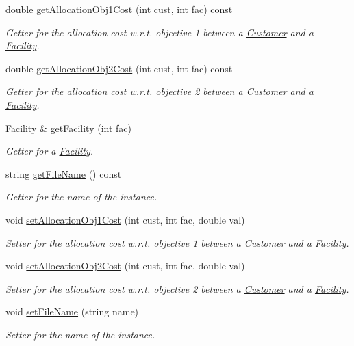 \begin{DoxyCompactItemize}
double \hyperlink{classData_add619285c8d74b143cb2526d319a2d55}{get\-Allocation\-Obj1\-Cost} (int cust, int fac) const 
\begin{DoxyCompactList}\small\item\em \-Getter for the allocation cost w.\-r.\-t. objective 1 between a {\ttfamily \hyperlink{classCustomer}{\-Customer}} and a {\ttfamily \hyperlink{classFacility}{\-Facility}}. \end{DoxyCompactList}\item 
double \hyperlink{classData_a3767a72ca109a228b506fbe3e14f90d9}{get\-Allocation\-Obj2\-Cost} (int cust, int fac) const 
\begin{DoxyCompactList}\small\item\em \-Getter for the allocation cost w.\-r.\-t. objective 2 between a {\ttfamily \hyperlink{classCustomer}{\-Customer}} and a {\ttfamily \hyperlink{classFacility}{\-Facility}}. \end{DoxyCompactList}\item 
\hyperlink{classFacility}{\-Facility} \& \hyperlink{classData_abde0e78402b92f0abe7937f027c391fe}{get\-Facility} (int fac)
\begin{DoxyCompactList}\small\item\em \-Getter for a {\ttfamily \hyperlink{classFacility}{\-Facility}}. \end{DoxyCompactList}\item 
string \hyperlink{classData_abd146628c404ac6483308e081a458b28}{get\-File\-Name} () const 
\begin{DoxyCompactList}\small\item\em \-Getter for the name of the instance. \end{DoxyCompactList}\item 
void \hyperlink{classData_a604a5141bbc46e2d246a6adbc815216e}{set\-Allocation\-Obj1\-Cost} (int cust, int fac, double val)
\begin{DoxyCompactList}\small\item\em \-Setter for the allocation cost w.\-r.\-t. objective 1 between a {\ttfamily \hyperlink{classCustomer}{\-Customer}} and a {\ttfamily \hyperlink{classFacility}{\-Facility}}. \end{DoxyCompactList}\item 
void \hyperlink{classData_a9c86a4f1223b800bc226678e16b3dd18}{set\-Allocation\-Obj2\-Cost} (int cust, int fac, double val)
\begin{DoxyCompactList}\small\item\em \-Setter for the allocation cost w.\-r.\-t. objective 2 between a {\ttfamily \hyperlink{classCustomer}{\-Customer}} and a {\ttfamily \hyperlink{classFacility}{\-Facility}}. \end{DoxyCompactList}\item 
void \hyperlink{classData_abbdfb8cc85f057bf7e084cc88012c326}{set\-File\-Name} (string name)
\begin{DoxyCompactList}\small\item\em \-Setter for the name of the instance. \end{DoxyCompactList}\end{DoxyCompactItemize}
